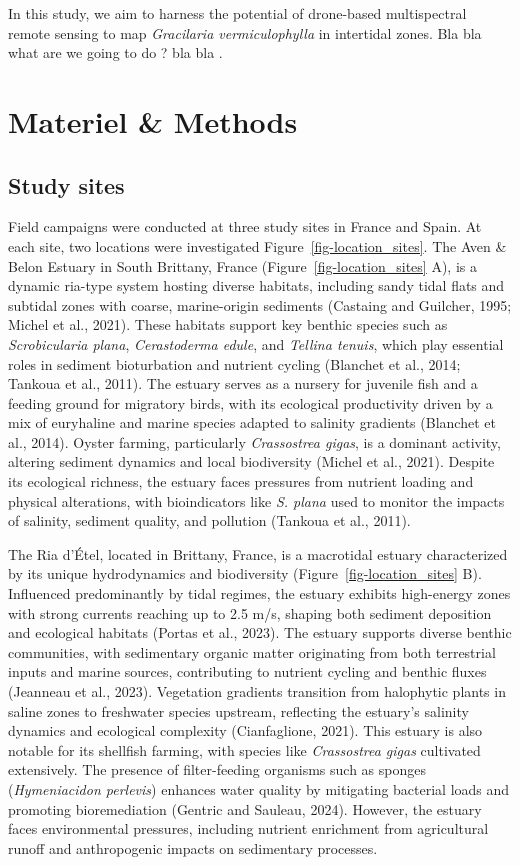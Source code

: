 \documentclass[
  letterpaper,
  DIV=11,
  numbers=noendperiod]{scrartcl}
\begin{document}
In this study, we aim to harness the potential of drone-based
multispectral remote sensing to map \emph{Gracilaria vermiculophylla} in
intertidal zones. Bla bla what are we going to do ? bla bla .

\section{Materiel \& Methods}\label{materiel-methods}

\subsection{Study sites}\label{study-sites}

Field campaigns were conducted at three study sites in France and Spain.
At each site, two locations were investigated
Figure~\ref{fig-location_sites}. The Aven \& Belon Estuary in South
Brittany, France (Figure~\ref{fig-location_sites} A), is a dynamic
ria-type system hosting diverse habitats, including sandy tidal flats
and subtidal zones with coarse, marine-origin sediments (Castaing and
Guilcher, 1995; Michel et al., 2021). These habitats support key benthic
species such as \emph{Scrobicularia plana}, \emph{Cerastoderma edule},
and \emph{Tellina tenuis}, which play essential roles in sediment
bioturbation and nutrient cycling (Blanchet et al., 2014; Tankoua et
al., 2011). The estuary serves as a nursery for juvenile fish and a
feeding ground for migratory birds, with its ecological productivity
driven by a mix of euryhaline and marine species adapted to salinity
gradients (Blanchet et al., 2014). Oyster farming, particularly
\emph{Crassostrea gigas}, is a dominant activity, altering sediment
dynamics and local biodiversity (Michel et al., 2021). Despite its
ecological richness, the estuary faces pressures from nutrient loading
and physical alterations, with bioindicators like \emph{S. plana} used
to monitor the impacts of salinity, sediment quality, and pollution
(Tankoua et al., 2011).

The Ria d'Étel, located in Brittany, France, is a macrotidal estuary
characterized by its unique hydrodynamics and biodiversity
(Figure~\ref{fig-location_sites} B). Influenced predominantly by tidal
regimes, the estuary exhibits high-energy zones with strong currents
reaching up to 2.5 m/s, shaping both sediment deposition and ecological
habitats (Portas et al., 2023). The estuary supports diverse benthic
communities, with sedimentary organic matter originating from both
terrestrial inputs and marine sources, contributing to nutrient cycling
and benthic fluxes (Jeanneau et al., 2023). Vegetation gradients
transition from halophytic plants in saline zones to freshwater species
upstream, reflecting the estuary's salinity dynamics and ecological
complexity (Cianfaglione, 2021). This estuary is also notable for its
shellfish farming, with species like \emph{Crassostrea gigas} cultivated
extensively. The presence of filter-feeding organisms such as sponges
(\emph{Hymeniacidon perlevis}) enhances water quality by mitigating
bacterial loads and promoting bioremediation (Gentric and Sauleau,
2024). However, the estuary faces environmental pressures, including
nutrient enrichment from agricultural runoff and anthropogenic impacts
on sedimentary processes.
\end{document}
